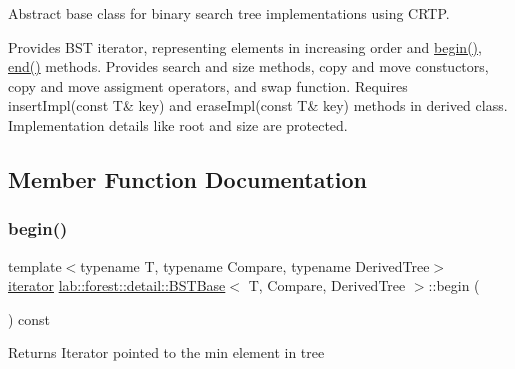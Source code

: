 Abstract base class for binary search tree implementations using C\+R\+TP. 

Provides B\+ST iterator, representing elements in increasing order and \hyperlink{classlab_1_1forest_1_1detail_1_1BSTBase_aee57d4461130971ad187ea41bc8e4e74}{begin()}, \hyperlink{classlab_1_1forest_1_1detail_1_1BSTBase_ad2ea364cc61d5581a861d1aab3734129}{end()} methods. Provides search and size methods, copy and move constuctors, copy and move assigment operators, and swap function. Requires insert\+Impl(const T\& key) and erase\+Impl(const T\& key) methods in derived class. Implementation details like root and size are protected. 

\subsection{Member Function Documentation}
\mbox{\label{classlab_1_1forest_1_1detail_1_1BSTBase_aee57d4461130971ad187ea41bc8e4e74}} 
\subsubsection{\texorpdfstring{begin()}{begin()}}
{\footnotesize\ttfamily template$<$typename T, typename Compare, typename Derived\+Tree$>$ \\
\hyperlink{classlab_1_1forest_1_1detail_1_1BSTIterator}{iterator} \hyperlink{classlab_1_1forest_1_1detail_1_1BSTBase}{lab\+::forest\+::detail\+::\+B\+S\+T\+Base}$<$ T, Compare, Derived\+Tree $>$\+::begin (\begin{DoxyParamCaption}{ }\end{DoxyParamCaption}) const\hspace{0.3cm}{\ttfamily [noexcept]}}

\begin{DoxyReturn}{Returns}
Iterator pointed to the min element in tree 
\end{DoxyReturn}
\mbox{\label{classlab_1_1forest_1_1detail_1_1BSTBase_a8986f7a9fd8ef965740f0fd1acd71dd3}} 
